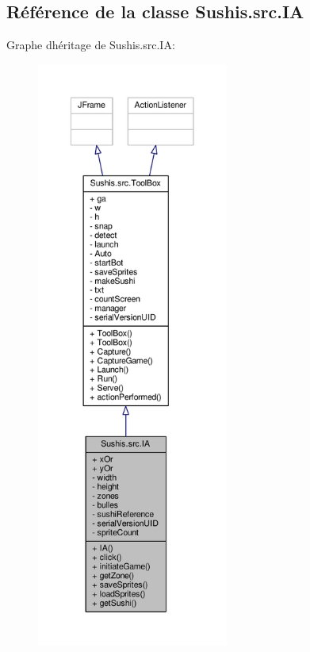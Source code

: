 \hypertarget{classSushis_1_1src_1_1IA}{}\subsection{Référence de la classe Sushis.\+src.\+I\+A}
\label{classSushis_1_1src_1_1IA}


Graphe d\textquotesingle{}héritage de Sushis.\+src.\+I\+A\+:\nopagebreak
\begin{figure}[H]
\begin{center}
\leavevmode
\includegraphics[height=550pt]{classSushis_1_1src_1_1IA__inherit__graph}
\end{center}
\end{figure}


